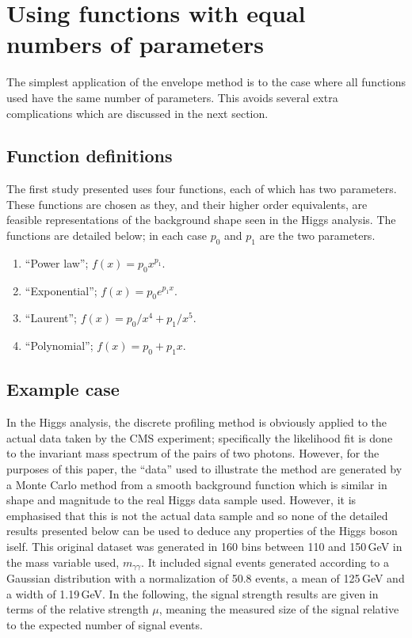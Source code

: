 \section{Using functions with equal numbers of parameters} %
\label{sec:functions}

The simplest application of the envelope method is to the case where all
functions used have the same number of parameters. This avoids several extra
complications which are discussed in the next section.

\subsection{Function definitions}
\label{sec:functions:function}

The first study presented uses four functions, each of which has two parameters.
These functions are chosen as they, and their higher order equivalents,
are feasible representations of the background shape seen in the Higgs
analysis. The functions are detailed below; in each case $p_0$ and $p_1$ are
the two parameters.
\begin{enumerate}
\item
``Power law''; $f(x) = p_0 x^{p_1}$.
\item
``Exponential''; $f(x) = p_0 e^{p_1x}$.
\item
``Laurent''; $f(x) = p_0/x^4 + p_1/x^5$.
\item
``Polynomial''; $f(x) = p_0 + p_1 x$.
\end{enumerate}


\subsection{Example case}
\label{sec:functions:example}

In the Higgs analysis, the discrete profiling method is obviously applied to
the actual data taken by the CMS experiment; specifically the likelihood fit
is done to the invariant mass spectrum of the pairs of two photons.
However, for the purposes of this
paper, the ``data'' used to illustrate the method are generated by a Monte Carlo
method from a smooth background
function which is similar in shape and magnitude to the
real Higgs data sample used. However, it is emphasised that this is not the 
actual data sample and so 
none of the detailed results presented below can be used to deduce any
properties of the Higgs boson iself.
This original dataset was generated in 160 bins between 110 and 150\,GeV in
the mass variable used, $m_{\gamma\gamma}$.
It included signal events
generated according to a Gaussian distribution with a normalization of 50.8 events, a mean of 125\,GeV and a 
width of 1.19\,GeV. In the following, the signal strength results are given in
terms of the relative strength $\mu$, 
meaning the measured size of the signal relative
to the expected number of signal events.


